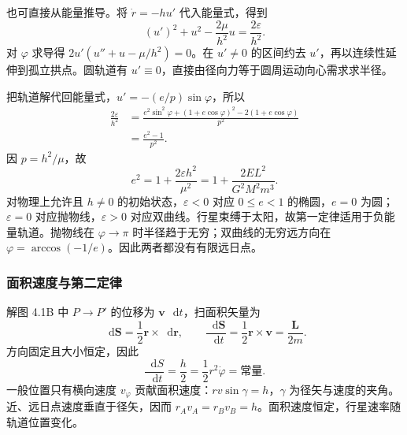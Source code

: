 \documentclass[UTF8,fontset=fandol,a4paper,11pt]{ctexart}
\newcommand{\dd}{\mathop{}\!\mathrm{d}}
\newcommand{\vect}[1]{\bm{#1}}
\newcommand{\figcaption}[1]{\par\vspace{2pt}{\small\color{muted}#1}\par}
\begin{document}
也可直接从能量推导。将 $\dot r=-hu'$ 代入能量式，得到
\[
(u')^2+u^2-\frac{2\mu}{h^2}u=\frac{2\varepsilon}{h^2}.
\]
对 $\varphi$ 求导得 $2u'(u''+u-\mu/h^2)=0$。在 $u'\ne0$ 的区间约去 $u'$，再以连续性延伸到孤立拱点。圆轨道有 $u'\equiv0$，直接由径向力等于圆周运动向心需求求半径。

把轨道解代回能量式，$u'=-(e/p)\sin\varphi$，所以
\[
\begin{aligned}
\frac{2\varepsilon}{h^2}
&=\frac{e^2\sin^2\varphi+(1+e\cos\varphi)^2
 -2(1+e\cos\varphi)}{p^2}\\
&=\frac{e^2-1}{p^2}.
\end{aligned}
\]
因 $p=h^2/\mu$，故
\[
\boxed{e^2=1+\frac{2\varepsilon h^2}{\mu^2}
=1+\frac{2EL^2}{G^2M^2m^3}}.
\]
对物理上允许且 $h\ne0$ 的初始状态，$\varepsilon<0$ 对应 $0\leq e<1$ 的椭圆，$e=0$ 为圆；$\varepsilon=0$ 对应抛物线，$\varepsilon>0$ 对应双曲线。行星束缚于太阳，故第一定律适用于负能量轨道。抛物线在 $\varphi\to\pi$ 时半径趋于无穷；双曲线的无穷远方向在 $\varphi=\arccos(-1/e)$。因此两者都没有有限远日点。

\subsubsection*{面积速度与第二定律}
\par\medskip\noindent\begin{minipage}{\linewidth}\centering
{}
\figcaption{解图 4.1B　径矢扫过的微元面积。}
\end{minipage}\par\medskip

解图 4.1B 中 $P\to P'$ 的位移为 $\vect v\,\dd t$，扫面积矢量为
\[
\dd\vect S=\frac12\vect r\times\dd\vect r,
\qquad \frac{\dd\vect S}{\dd t}=\frac12\vect r\times\vect v
=\frac{\vect L}{2m}.
\]
方向固定且大小恒定，因此
\[
\boxed{\frac{\dd S}{\dd t}=\frac h2
=\frac12r^2\dot\varphi=\text{常量}}.
\]
一般位置只有横向速度 $v_\varphi$ 贡献面积速度：$rv\sin\gamma=h$，$\gamma$ 为径矢与速度的夹角。近、远日点速度垂直于径矢，因而 $r_Av_A=r_Bv_B=h$。面积速度恒定，行星速率随轨道位置变化。
\end{document}
